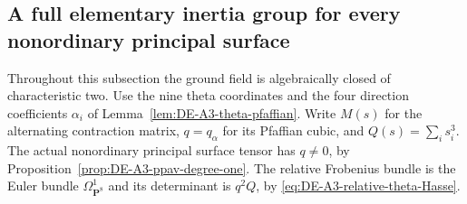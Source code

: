 \subsection{A full elementary inertia group for every nonordinary principal surface}
\label{sec:nonordinary-uniform-Q-inertia-candidate}

Throughout this subsection the ground field is algebraically closed of
characteristic two. Use the nine theta coordinates and the four direction
coefficients $\alpha_i$ of Lemma~\ref{lem:DE-A3-theta-pfaffian}. Write
$M(s)$ for the alternating contraction matrix, $q=q_\alpha$ for its
Pfaffian cubic, and $Q(s)=\sum_i s_i^3$. The actual nonordinary principal
surface tensor has $q\ne0$, by
Proposition~\ref{prop:DE-A3-ppav-degree-one}. The relative Frobenius
bundle is the Euler bundle $\Omega^1_{\mathbf P^8}$ and its determinant
is $q^2Q$, by \eqref{eq:DE-A3-relative-theta-Hasse}.

